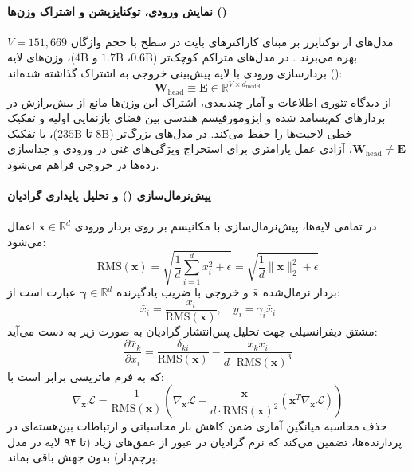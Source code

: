 \paragraph*{نمایش ورودی، توکنایزیشن و اشتراک وزن‌ها ()}
مدل‌های  از توکنایزر  بر مبنای کاراکترهای بایت در سطح  با حجم واژگان $V = 151,669$ بهره می‌برند \cite{sennrich2016neural, brown2020language, wang2020neural, bai2023qwen}. در مدل‌های متراکم کوچک‌تر ($0.6\text{B}$، $1.7\text{B}$ و $4\text{B}$)، وزن‌های لایه بردارسازی ورودی با لایه پیش‌بینی خروجی به اشتراک گذاشته شده‌اند ():
\begin{equation}
    \mathbf{W}_{\text{head}} \equiv \mathbf{E} \in \mathbb{R}^{V \times d_{\text{model}}}
\end{equation}
از دیدگاه تئوری اطلاعات و آمار چندبعدی، اشتراک این وزن‌ها مانع از بیش‌برازش در بردارهای کم‌بسامد شده و ایزومورفیسم هندسی بین فضای بازنمایی اولیه و تفکیک خطی لاجیت‌ها را حفظ می‌کند. در مدل‌های بزرگ‌تر ($8\text{B}$ تا $235\text{B}$)، با تفکیک $\mathbf{W}_{\text{head}} \neq \mathbf{E}$، آزادی عمل پارامتری برای استخراج ویژگی‌های غنی در ورودی و جداسازی رده‌ها در خروجی فراهم می‌شود.

\paragraph*{پیش‌نرمال‌سازی () و تحلیل پایداری گرادیان}
در تمامی لایه‌ها، پیش‌نرمال‌سازی با مکانیسم  \cite{jiang2023prermsnorm} بر روی بردار ورودی $\mathbf{x} \in \mathbb{R}^{d}$ اعمال می‌شود:
\begin{equation}
    \text{RMS}(\mathbf{x}) = \sqrt{\frac{1}{d} \sum_{i=1}^d x_i^2 + \epsilon} = \sqrt{\frac{1}{d} \|\mathbf{x}\|_2^2 + \epsilon}
\end{equation}
بردار نرمال‌شده $\bar{\mathbf{x}}$ و خروجی با ضریب یادگیرنده $\boldsymbol{\gamma} \in \mathbb{R}^d$ عبارت است از:
\begin{equation}
    \bar{x}_i = \frac{x_i}{\text{RMS}(\mathbf{x})}, \quad y_i = \gamma_i \bar{x}_i
\end{equation}
مشتق دیفرانسیلی جهت تحلیل پس‌انتشار گرادیان به صورت زیر به دست می‌آید:
\begin{equation}
    \frac{\partial \bar{x}_k}{\partial x_i} = \frac{\delta_{ki}}{\text{RMS}(\mathbf{x})} - \frac{x_k x_i}{d \cdot \text{RMS}(\mathbf{x})^3}
\end{equation}
که به فرم ماتریسی برابر است با:
\begin{equation}
    \nabla_{\mathbf{x}} \mathcal{L} = \frac{1}{\text{RMS}(\mathbf{x})} \left( \nabla_{\bar{\mathbf{x}}} \mathcal{L} - \frac{\mathbf{x}}{d \cdot \text{RMS}(\mathbf{x})^2} \left( \mathbf{x}^T \nabla_{\bar{\mathbf{x}}} \mathcal{L} \right) \right)
\end{equation}
حذف محاسبه میانگین آماری ضمن کاهش بار محاسباتی و ارتباطات بین‌هسته‌ای در پردازنده‌ها، تضمین می‌کند که نرم گرادیان در عبور از عمق‌های زیاد (تا ۹۴ لایه در مدل پرچم‌دار) بدون جهش باقی بماند.

